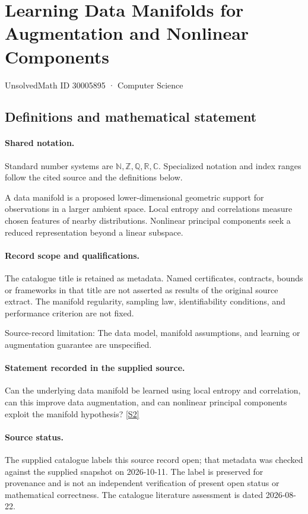\documentclass[11pt]{article}
\newcommand{\sref}[2]{\hyperlink{source:#1:#2}{[S#2]}}
\begin{document}
\setcounter{section}{30005894}
\section{Learning Data Manifolds for Augmentation and Nonlinear Components}\label{30005895}
{\small\sffamily UnsolvedMath ID 30005895 · Computer Science}
\subsection{Definitions and mathematical statement}

\paragraph{Shared notation.}Standard number systems are $\mathbb N,\mathbb Z,\mathbb Q,\mathbb R,\mathbb C$. Specialized notation and index ranges follow the cited source and the definitions below.


A data manifold is a proposed lower-dimensional geometric support for observations in a larger ambient space. Local entropy and correlations measure chosen features of nearby distributions. Nonlinear principal components seek a reduced representation beyond a linear subspace.
\paragraph{Record scope and qualifications.}
The catalogue title is retained as metadata. Named certificates, contracts, bounds or frameworks in that title are not asserted as results of the original source extract.
The manifold regularity, sampling law, identifiability conditions, and performance criterion are not fixed.

Source-record limitation: The data model, manifold assumptions, and learning or augmentation guarantee are unspecified.
\paragraph{Statement recorded in the supplied source.}
Can the underlying data manifold be learned using local entropy and correlation, can this improve data augmentation, and can nonlinear principal components exploit the manifold hypothesis? \sref{30005895}{2}
\paragraph{Source status.}
The supplied catalogue labels this source record open; that metadata was checked against the supplied snapshot on 2026-10-11. The label is preserved for provenance and is not an independent verification of present open status or mathematical correctness. The catalogue literature assessment is dated 2026-08-22.
\end{document}
